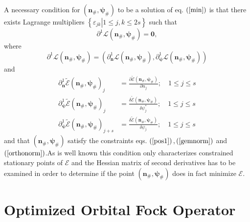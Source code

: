 \documentclass[aps,preprint]{revtex4}%
\begin{document}
A necessary condition for $\left(  \mathbf{n}_{\#}\mathbf{,\psi}_{\#}\right)
$ to be a solution of eq. $\left(  \ref{min}\right)  $ is that there exists
Lagrange multipliers $\left\{  \left.  \varepsilon_{jk}\right\vert 1\leq
j,k\leq2s\right\}  $ such that
\begin{equation}
\partial^{1}\mathcal{L}\left(  \mathbf{n}_{\#}\mathbf{,\psi}_{\#}\right)
=\mathbf{0,}%
\end{equation}
where
\begin{equation}
\left.  \partial^{1}\mathcal{L}\left(  \mathbf{n}_{\#}\mathbf{,\psi}%
_{\#}\right)  \right.  =\left(  \partial_{\mathbf{n}}^{1}\mathcal{L}\left(
\mathbf{n}_{\#}\mathbf{,\psi}_{\#}\right)  ,\partial_{\mathbf{\psi}}%
^{1}\mathcal{L}\left(  \mathbf{n}_{\#}\mathbf{,\psi}_{\#}\right)  \right)
\end{equation}
and
\begin{align}
\partial_{\mathbf{n}}^{1}\mathcal{\tilde{E}}\left(  \mathbf{n}_{\#}%
\mathbf{,\psi}_{\#}\right)  _{j}  &  =\frac{\partial\mathcal{\tilde{E}}\left(
\mathbf{n}_{\#}\mathbf{,\psi}_{\#}\right)  }{\partial n_{j}};\quad1\leq j\leq
s\nonumber\\
\partial_{\mathbf{\psi}}^{1}\mathcal{\tilde{E}}\left(  \mathbf{n}%
_{\#}\mathbf{,\psi}_{\#}\right)  _{j}  &  =\frac{\delta\mathcal{\tilde{E}%
}\left(  \mathbf{n}_{\#}\mathbf{,\psi}_{\#}\right)  }{\delta\psi_{j}^{\ast}%
};\quad1\leq j\leq s\nonumber\\
\partial_{\mathbf{\psi}}^{1}\mathcal{\tilde{E}}\left(  \mathbf{n}%
_{\#}\mathbf{,\psi}_{\#}\right)  _{j+s}  &  =\frac{\delta\mathcal{\tilde{E}%
}\left(  \mathbf{n}_{\#}\mathbf{,\psi}_{\#}\right)  }{\delta\psi_{j}}%
;\quad1\leq j\leq s
\end{align}
and that $\left(  \mathbf{n}_{\#}\mathbf{,\psi}_{\#}\right)  $ satisfy the
constraints eqs. $\left(  \ref{pos1}\right)  ,\left(  \ref{gemnorm}\right)  $
and $\left(  \ref{orthonorm}\right)  $.As is well known this condition only
characterizes constrained stationary points of $\mathcal{E}$ and the Hessian
matrix of second derivatives has to be examined in order to determine if the
point $\left(  \mathbf{n}_{\#}\mathbf{,\psi}_{\#}\right)  $ does in fact
minimize $\mathcal{E}.$

\section{Optimized Orbital Fock Operator\label{saddle}}
\end{document}
